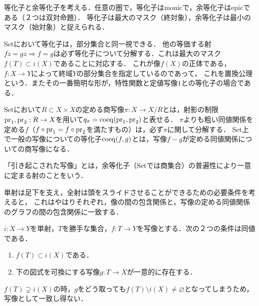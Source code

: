 \documentclass[uplatex,dvipdfmx]{jsreport}
\begin{document}
\begin{screen}
    等化子と余等化子を考える．任意の圏で，等化子はmonicで，余等化子はepicである（２つは双対命題）．
    等化子は最大のマスク（終対象），余等化子は最小のマスク（始対象）と捉えられる．

    Setにおいて等化子は，部分集合と同一視できる．
    他の等価する射$fz=gz\Rightarrow f=g$は必ず等化子について分解する．これは最大のマスク$f(T)\subset i(X)$であることに対応する．
    これが像$f(X)$の正体である，$f:X\to Y$によって終域$Y$の部分集合を指定しているのであって，
    これを置換公理という．またその一番簡明な形が，特性関数と定値写像$1$との等化子の場合である．

    Setにおいて$R\subset X\times X$の定める商写像$\pi:X\to X/R$とは，射影の制限$\mathrm{pr}_1,\mathrm{pr}_2:R\to X$を用いて$q_\pi=\mathrm{coeq}(\mathrm{pr}_1,\mathrm{pr}_2)$と表せる．
    $\pi$よりも粗い同値関係を定める$f$（$f\circ \mathrm{pr}_1=f\circ\mathrm{pr}_2$を満たすもの）は，必ず$\pi$に関して分解する．
    Set上で一般の写像についての等化子$\mathrm{coeq}(f,g)$とは，写像$f-g$が定める同値関係についての商写像になる．

    「引き起こされた写像」とは，余等化子（Setでは商集合）の普遍性により一意に定まる射のことをいう．

    単射は足下を支え，全射は頭をスライドさせることができるための必要条件を考えると，
    これはやはりそれぞれ，像の間の包含関係と，写像の定める同値関係のグラフの間の包含関係に一致する．
\end{screen}

\begin{proposition}
    $i:X\to Y$を単射，$T$を勝手な集合，$f:T\to Y$を写像とする．次の２つの条件は同値である．
    \begin{enumerate}
        \item $f(T)\subset i(X)$である．
        \item 下の図式を可換にする写像$g:T\to X$が一意的に存在する．
        \begin{center}\end{center}
    \end{enumerate}
\end{proposition}
$f(T)\supsetneq i(X)$の時，$g$をどう取っても$f(T)\setminus i(X)\ne\varnothing$となってしまうため，写像として一致し得ない．
\end{document}

